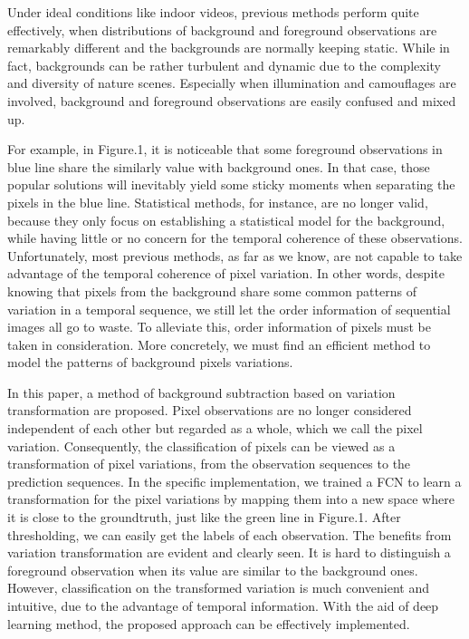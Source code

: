 \documentclass[runningheads,a4paper]{llncs}
\begin{document}
Under ideal conditions like indoor videos, previous methods perform quite effectively, when distributions of background and foreground observations are remarkably different and the backgrounds are normally keeping static. While in fact, backgrounds can be rather turbulent and dynamic due to the complexity and diversity of nature scenes. Especially when illumination and camouflages are involved, background and foreground observations are easily confused and mixed up. 

For example, in Figure.1, it is noticeable that some foreground observations in blue line share the similarly value with background ones. In that case, those popular solutions will inevitably yield some sticky moments when separating the pixels in the blue line. Statistical methods, for instance, are no longer valid, because they only focus on establishing a statistical model for the background, while having little or no concern for the temporal coherence of these observations. Unfortunately, most previous methods, as far as we know, are not capable to take advantage of the temporal coherence of pixel variation. In other words, despite knowing that pixels from the background share some common patterns of variation in a temporal sequence, we still let the order information of sequential images all go to waste. To alleviate this, order information of pixels must be taken in consideration. More concretely, we must find an efficient method to model the patterns of background pixels variations.

In this paper, a method of background subtraction based on variation transformation are proposed. Pixel observations are no longer considered independent of each other but regarded as a whole, which we call the pixel variation. Consequently, the classification of pixels can be viewed as a transformation of pixel variations, from the observation sequences to the prediction sequences. In the specific implementation, we trained a FCN to learn a transformation for the pixel variations by mapping them into a new space where it is close to the groundtruth, just like the green line in Figure.1. After thresholding, we can easily get the labels of each observation. The benefits from variation transformation are evident and clearly seen. It is hard to distinguish a foreground observation when its value are similar to the background ones. However, classification on the transformed variation is much convenient and intuitive, due to the advantage of temporal information. With the aid of deep learning method, the proposed approach can be effectively implemented.
\end{document}
